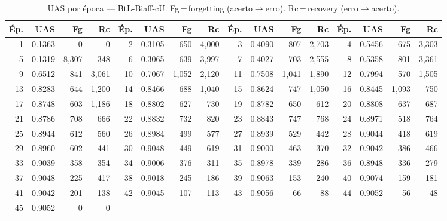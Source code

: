 \begin{table}[ht]
\centering\scriptsize
\caption{UAS por época --- BtL-Biaff-cU. Fg\,=\,forgetting (acerto$\to$erro). Rc\,=\,recovery (erro$\to$acerto).}
\label{tab:uas-predictions-results-bertimbau-large-biaffine}
\begin{tabular}{rrrr rrrr rrrr rrrr}
\toprule
\textbf{Ép.} & \textbf{UAS} & \textbf{Fg} & \textbf{Rc} & \textbf{Ép.} & \textbf{UAS} & \textbf{Fg} & \textbf{Rc} & \textbf{Ép.} & \textbf{UAS} & \textbf{Fg} & \textbf{Rc} & \textbf{Ép.} & \textbf{UAS} & \textbf{Fg} & \textbf{Rc} \\
\midrule
1 & 0.1363 & 0 & 0 & 2 & 0.3105 & 650 & 4,000 & 3 & 0.4090 & 807 & 2,703 & 4 & 0.5456 & 675 & 3,303 \\
5 & 0.1319 & 8,307 & 348 & 6 & 0.3065 & 639 & 3,997 & 7 & 0.4027 & 703 & 2,555 & 8 & 0.5358 & 801 & 3,361 \\
9 & 0.6512 & 841 & 3,061 & 10 & 0.7067 & 1,052 & 2,120 & 11 & 0.7508 & 1,041 & 1,890 & 12 & 0.7994 & 570 & 1,505 \\
13 & 0.8283 & 644 & 1,200 & 14 & 0.8466 & 688 & 1,040 & 15 & 0.8624 & 747 & 1,050 & 16 & 0.8445 & 1,093 & 750 \\
17 & 0.8748 & 603 & 1,186 & 18 & 0.8802 & 627 & 730 & 19 & 0.8782 & 650 & 612 & 20 & 0.8808 & 637 & 687 \\
21 & 0.8786 & 708 & 666 & 22 & 0.8832 & 732 & 820 & 23 & 0.8843 & 747 & 768 & 24 & 0.8971 & 518 & 764 \\
25 & 0.8944 & 612 & 560 & 26 & 0.8984 & 499 & 577 & 27 & 0.8939 & 529 & 442 & 28 & 0.9044 & 418 & 619 \\
29 & 0.8960 & 602 & 441 & 30 & 0.9048 & 449 & 619 & 31 & 0.9000 & 463 & 370 & 32 & 0.9042 & 386 & 466 \\
33 & 0.9039 & 358 & 354 & 34 & 0.9006 & 376 & 311 & 35 & 0.8978 & 339 & 286 & 36 & 0.8948 & 336 & 279 \\
37 & 0.9048 & 225 & 417 & 38 & 0.9018 & 245 & 186 & 39 & 0.9063 & 153 & 240 & 40 & 0.9074 & 159 & 181 \\
41 & 0.9042 & 201 & 138 & 42 & 0.9045 & 107 & 113 & 43 & 0.9056 & 66 & 88 & 44 & 0.9052 & 56 & 48 \\
45 & 0.9052 & 0 & 0 &  & & &  &  & & &  &  & & &  \\
\bottomrule
\end{tabular}
\end{table}
